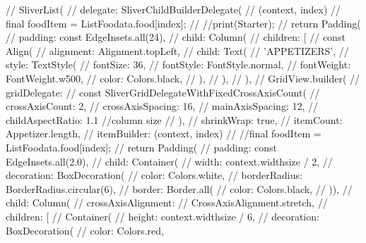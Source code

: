 // SliverList(
          //   delegate: SliverChildBuilderDelegate(
          //     (context, index) {
          //       final foodItem = ListFoodata.food[index];
          //       //print(Starter);
          //       return Padding(
          //         padding: const EdgeInsets.all(24),
          //         child: Column(
          //           children: [
          //             const Align(
          //               alignment: Alignment.topLeft,
          //               child: Text(
          //                 'APPETIZERS',
          //                 style: TextStyle(
          //                   fontSize: 36,
          //                   fontStyle: FontStyle.normal,
          //                   fontWeight: FontWeight.w500,
          //                   color: Colors.black,
          //                 ),
          //               ),
          //             ),
          //             GridView.builder(
          //               gridDelegate:
          //                   const SliverGridDelegateWithFixedCrossAxisCount(
          //                       crossAxisCount: 2,
          //                       crossAxisSpacing: 16,
          //                       mainAxisSpacing: 12,
          //                       childAspectRatio: 1.1 //column size
          //                       ),
          //               shrinkWrap: true,
          //               itemCount: Appetizer.length,
          //               itemBuilder: (context, index) {
          //                 //final foodItem = ListFoodata.food[index];
          //                 return Padding(
          //                   padding: const EdgeInsets.all(2.0),
          //                   child: Container(
          //                     width: context.widthsize / 2,
          //                     decoration: BoxDecoration(
          //                         color: Colors.white,
          //                         borderRadius: BorderRadius.circular(6),
          //                         border: Border.all(
          //                           color: Colors.black,
          //                         )),
          //                     child: Column(
          //                         crossAxisAlignment:
          //                             CrossAxisAlignment.stretch,
          //                         children: [
          //                           Container(
          //                             height: context.widthsize / 6,
          //                             decoration: BoxDecoration(
          //                                 color: Colors.red,
}}
